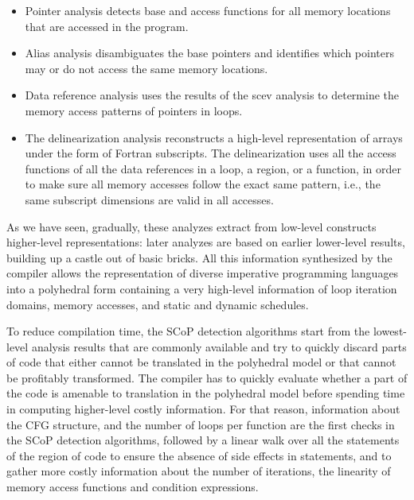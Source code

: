 \documentclass{sig-alternate}
\begin{document}
\begin{itemize}
\item Pointer analysis detects base and access functions for all memory
  locations that are accessed in the program.

\item Alias analysis disambiguates the base pointers and identifies which
  pointers may or do not access the same memory locations.

\item Data reference analysis uses the results of the scev analysis to determine
  the memory access patterns of pointers in loops.

\item The delinearization analysis \cite{delinearization1, delinearization2}
  reconstructs a high-level representation of arrays under the form of Fortran
  subscripts.  The delinearization uses all the access functions of all the data
  references in a loop, a region, or a function, in order to make sure all
  memory accesses follow the exact same pattern, i.e., the same subscript
  dimensions are valid in all accesses.
\end{itemize}

As we have seen, gradually, these analyzes extract from low-level constructs
higher-level representations: later analyzes are based on earlier lower-level
results, building up a castle out of basic bricks.  All this information
synthesized by the compiler allows the representation of diverse imperative
programming languages into a polyhedral form \cite{Girbal} containing a very
high-level information of loop iteration domains, memory accesses, and static
and dynamic schedules.

To reduce compilation time, the SCoP detection algorithms start from the
lowest-level analysis results that are commonly available and try to quickly
discard parts of code that either cannot be translated in the polyhedral model
or that cannot be profitably transformed.  The compiler has to quickly evaluate
whether a part of the code is amenable to translation in the polyhedral model
before spending time in computing higher-level costly information.  For that
reason, information about the CFG structure, and the number of loops per
function are the first checks in the SCoP detection algorithms, followed by a
linear walk over all the statements of the region of code to ensure the absence
of side effects in statements, and to gather more costly information about the
number of iterations, the linearity of memory access functions and condition
expressions.
\end{document}
